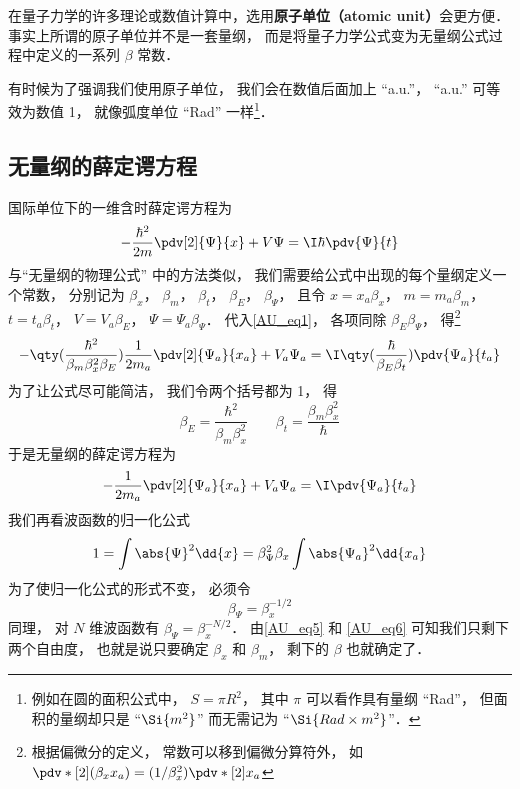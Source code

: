 

在量子力学的许多理论或数值计算中，选用\textbf{原子单位（atomic unit）}会更方便． 事实上所谓的原子单位并不是一套量纲， 而是将量子力学公式变为无量纲公式过程中定义的一系列 $\beta$ 常数．

有时候为了强调我们使用原子单位， 我们会在数值后面加上 “a.u.”， “a.u.” 可等效为数值 1， 就像弧度单位 “Rad” 一样\footnote{例如在圆的面积公式中， $S = \pi R^2$， 其中 $\pi$ 可以看作具有量纲 “Rad”， 但面积的量纲却只是 “$\Si{m^2}$” 而无需记为 “$\Si{Rad\times m^2}$”．}．

\subsection{无量纲的薛定谔方程}
国际单位下的一维含时薛定谔方程为
\begin{equation}\label{AU_eq1}
-\frac{\hbar^2}{2m} \pdv[2]{\Psi}{x} + V\Psi= \I\hbar \pdv{\Psi}{t}
\end{equation}
与“无量纲的物理公式” 中的方法类似， 我们需要给公式中出现的每个量纲定义一个常数， 分别记为 $\beta_x$， $\beta_m$， $\beta_t$， $\beta_E$， $\beta_\Psi$， 且令 $x = x_a\beta_x$， $m = m_a\beta_m$， $t = t_a\beta_t$， $V = V_a\beta_E$， $\Psi = \Psi_a \beta_\Psi$．
代入\autoref{AU_eq1}， 各项同除 $\beta_E\beta_\Psi$， 得\footnote{根据偏微分的定义， 常数可以移到偏微分算符外， 如 $\pdv*[2]{(\beta_x x_a)} = (1/\beta_x^2) \pdv*[2]{x_a}$}
\begin{equation}
-\qty(\frac{\hbar^2}{\beta_m\beta_x^2\beta_E})\frac{1}{2m_a} \pdv[2]{\Psi_a}{x_a} + V_a\Psi_a= \I\qty(\frac{\hbar}{\beta_E\beta_t})\pdv{\Psi_a}{t_a}
\end{equation}
为了让公式尽可能简洁， 我们令两个括号都为 1， 得
\begin{equation}\label{AU_eq6}
\beta_E = \frac{\hbar^2}{\beta_m\beta_x^2}
\qquad
\beta_t = \frac{\beta_m\beta_x^2}{\hbar}
\end{equation}
于是无量纲的薛定谔方程为
\begin{equation}\label{AU_eq4}
-\frac{1}{2m_a} \pdv[2]{\Psi_a}{x_a} + V_a\Psi_a= \I\pdv{\Psi_a}{t_a}
\end{equation}
我们再看波函数的归一化公式
\begin{equation}
1 = \int \abs{\Psi}^2 \dd{x} = \beta_\Psi^2 \beta_x \int \abs{\Psi_a}^2 \dd{x_a}
\end{equation}
为了使归一化公式的形式不变， 必须令
\begin{equation}\label{AU_eq5}
\beta_\Psi = \beta_x^{-1/2}
\end{equation}
同理， 对 $N$ 维波函数有 $\beta_\Psi = \beta_x^{-N/2}$．
由\autoref{AU_eq5} 和 \autoref{AU_eq6} 可知我们只剩下两个自由度， 也就是说只要确定 $\beta_x$ 和 $\beta_m$， 剩下的 $\beta$ 也就确定了．

